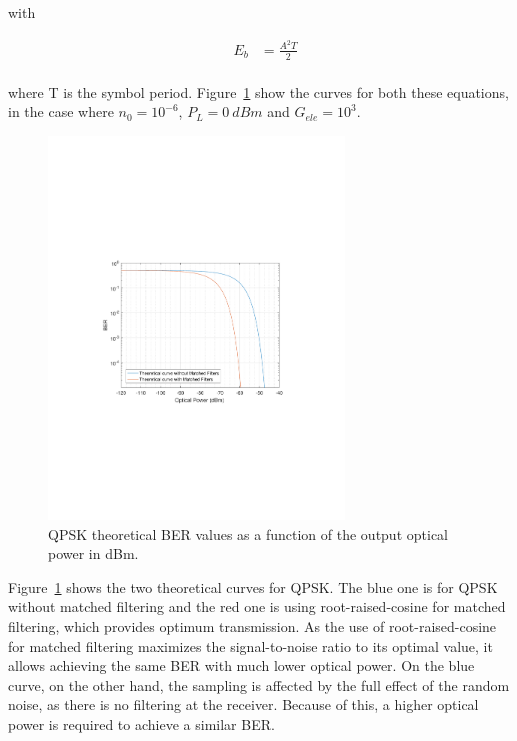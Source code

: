 with

\begin{eqnarray}
&E_b &= \frac{A^2 T}{2} \\
\end{eqnarray}

\noindent where T is the symbol period.
Figure~\ref{fig:QPSK_th_curves} show the curves for both these equations, in the case where  $n_0=10^{-6}$, $P_L = 0~dBm$ and $G_{ele} = 10^3$.


\begin{figure}[H]
		\centering
		\includegraphics[clip, trim=4cm 8cm 4cm 8cm, width=0.7\textwidth]{./sdf/m_qam_system/figures/teor_BER_curves.pdf}
		\caption{QPSK theoretical BER values as a function of the output optical power in dBm.\label{fig:QPSK_th_curves}}	
\end{figure}

Figure~\ref{fig:QPSK_th_curves} shows the two theoretical curves for QPSK. The blue one is for QPSK without matched filtering and the red one is using root-raised-cosine for matched filtering, which provides optimum transmission. As the use of root-raised-cosine for matched filtering maximizes the signal-to-noise ratio to its optimal value, it allows achieving the same BER with much lower optical power. On the blue curve, on the other hand, the sampling is affected by the full effect of the random noise, as there is no filtering at the receiver. Because of this, a higher optical power is required to achieve a similar BER.


